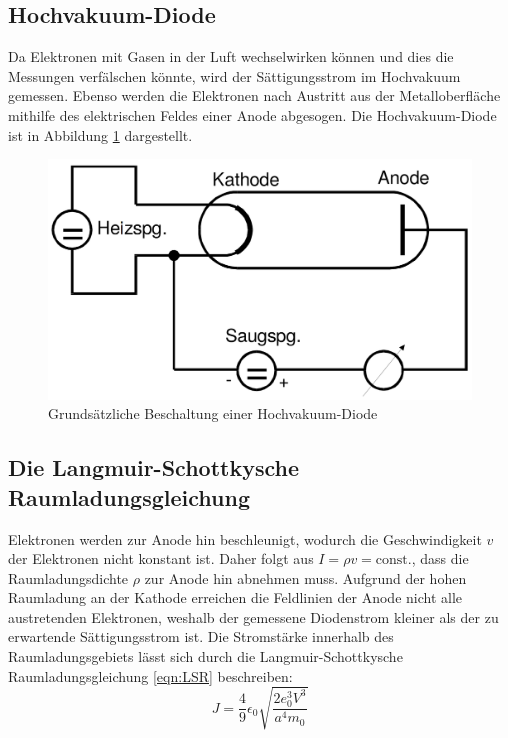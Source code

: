 \subsection {Hochvakuum-Diode}
Da Elektronen mit Gasen in der Luft wechselwirken können und dies die Messungen verfälschen könnte, wird der Sättigungsstrom im Hochvakuum gemessen.
Ebenso werden die Elektronen nach Austritt aus der Metalloberfläche mithilfe des elektrischen Feldes einer Anode abgesogen. Die Hochvakuum-Diode ist in Abbildung \ref{fig:Hochvakuum-Diode} dargestellt.
\begin{figure}[H]
  \centering
  \includegraphics[scale=0.25]{Text/Bilder/Hochvakuum-Diode}
  \caption{Grundsätzliche Beschaltung einer Hochvakuum-Diode \cite[96]{sample}}
  \label{fig:Hochvakuum-Diode}
\end{figure}

\subsection{Die Langmuir-Schottkysche Raumladungsgleichung }
Elektronen werden zur Anode hin beschleunigt, wodurch die Geschwindigkeit $v$ der Elektronen nicht konstant ist.
Daher folgt aus $I=\rho v=\text{const.}$, dass die Raumladungsdichte $\rho$ zur Anode hin abnehmen muss.
Aufgrund der hohen Raumladung an der Kathode erreichen die Feldlinien der Anode nicht alle austretenden Elektronen, weshalb der gemessene Diodenstrom kleiner als der zu erwartende Sättigungsstrom ist.
Die Stromstärke innerhalb des Raumladungsgebiets lässt sich durch die Langmuir-Schottkysche Raumladungsgleichung \eqref{eqn:LSR}  beschreiben:
\begin{equation}
	J = \frac{4}{9} \epsilon_0 \sqrt{\frac{2 e_0^3 V^3}{a^4 m_0} } \label{eqn:LSR}
\end{equation}

